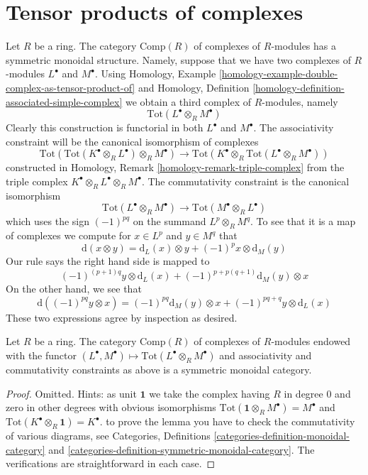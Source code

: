 \section{Tensor products of complexes}
\label{section-symmetric-monoidal}

\noindent
Let $R$ be a ring. The category $\text{Comp}(R)$ of complexes of $R$-modules
has a symmetric monoidal structure. Namely, suppose that we have two
complexes of $R$-modules $L^\bullet$ and $M^\bullet$. Using Homology, Example
\ref{homology-example-double-complex-as-tensor-product-of} and
Homology, Definition \ref{homology-definition-associated-simple-complex}
we obtain a third complex of $R$-modules, namely
$$
\text{Tot}(L^\bullet \otimes_R M^\bullet)
$$
Clearly this construction is functorial in both $L^\bullet$ and $M^\bullet$.
The associativity constraint will be the canonical isomorphism of complexes
$$
\text{Tot}(\text{Tot}(K^\bullet \otimes_R L^\bullet) \otimes_R M^\bullet)
\longrightarrow
\text{Tot}(K^\bullet \otimes_R \text{Tot}(L^\bullet \otimes_R M^\bullet))
$$
constructed in Homology, Remark \ref{homology-remark-triple-complex}
from the triple complex $K^\bullet \otimes_R L^\bullet \otimes_R M^\bullet$.
The commutativity constraint is the canonical isomorphism
$$
\text{Tot}(L^\bullet \otimes_R M^\bullet) \to
\text{Tot}(M^\bullet \otimes_R L^\bullet)
$$
which uses the sign $(-1)^{pq}$ on the summand $L^p \otimes_R M^q$.
To see that it is a map of complexes we compute for
$x \in L^p$ and $y \in M^q$ that
$$
\text{d}(x \otimes y) =
\text{d}_L(x) \otimes y + (-1)^px \otimes \text{d}_M(y)
$$
Our rule says the right hand side is mapped to
$$
(-1)^{(p + 1)q}y \otimes \text{d}_L(x) +
(-1)^{p + p(q + 1)} \text{d}_M(y) \otimes x
$$
On the other hand, we see that
$$
\text{d}((-1)^{pq}y \otimes x) =
(-1)^{pq} \text{d}_M(y) \otimes x +
(-1)^{pq + q} y \otimes \text{d}_L(x)
$$
These two expressions agree by inspection as desired.

\begin{lemma}
\label{lemma-symmetric-monoidal-cat-complexes}
Let $R$ be a ring. The category $\text{Comp}(R)$ of complexes of $R$-modules
endowed with the functor
$(L^\bullet, M^\bullet) \mapsto \text{Tot}(L^\bullet \otimes_R M^\bullet)$
and associativity and commutativity constraints as above is a symmetric
monoidal category.
\end{lemma}

\begin{proof}
Omitted. Hints: as unit $\mathbf{1}$ we take the complex having
$R$ in degree $0$ and zero in other degrees with obvious isomorphisms
$\text{Tot}(\mathbf{1} \otimes_R M^\bullet) = M^\bullet$ and
$\text{Tot}(K^\bullet \otimes_R \mathbf{1}) = K^\bullet$.
to prove the lemma you have to check the commutativity
of various diagrams, see Categories, Definitions
\ref{categories-definition-monoidal-category} and
\ref{categories-definition-symmetric-monoidal-category}.
The verifications are straightforward in each case.
\end{proof}

